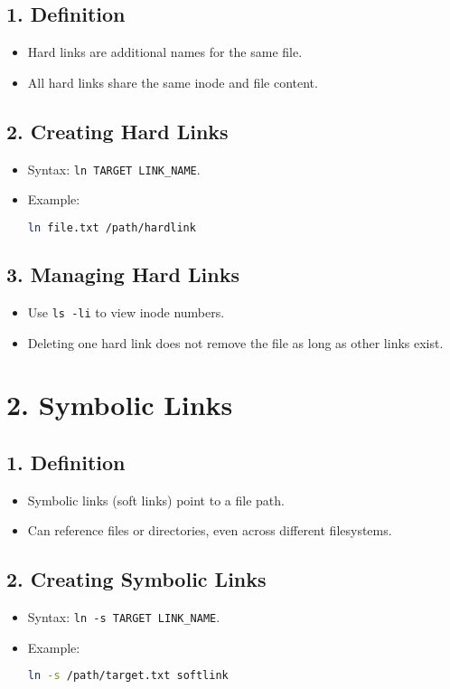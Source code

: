\documentclass[a4paper]{report}
\begin{document}
\subsection*{1. Definition}
\begin{itemize}
    \item Hard links are additional names for the same file.
    \item All hard links share the same inode and file content.
\end{itemize}

\subsection*{2. Creating Hard Links}
\begin{itemize}
    \item Syntax: \texttt{ln TARGET LINK\_NAME}.
    \item Example:
    \begin{lstlisting}[language=bash]
ln file.txt /path/hardlink
    \end{lstlisting}
\end{itemize}

\subsection*{3. Managing Hard Links}
\begin{itemize}
    \item Use \texttt{ls -li} to view inode numbers.
    \item Deleting one hard link does not remove the file as long as other links exist.
\end{itemize}

\section*{2. Symbolic Links}

\subsection*{1. Definition}
\begin{itemize}
    \item Symbolic links (soft links) point to a file path.
    \item Can reference files or directories, even across different filesystems.
\end{itemize}

\subsection*{2. Creating Symbolic Links}
\begin{itemize}
    \item Syntax: \texttt{ln -s TARGET LINK\_NAME}.
    \item Example:
    \begin{lstlisting}[language=bash]
ln -s /path/target.txt softlink
    \end{lstlisting}
\end{itemize}
\end{document}
